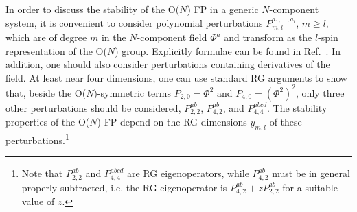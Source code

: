 \documentclass[a4paper,12pt]{article}
\begin{document}
In order to discuss the stability of the O($N$) FP  in a 
generic $N$-component system, 
it is convenient to consider polynomial perturbations  
$P_{m,l }^{a_1,\ldots,a_{l} }$, 
$m\ge l$, which are of degree $m$ in the $N$-component field $\Phi^a$
and transform as the $l$-spin representation of the O($N$) group.
Explicitly formulae can be found in Ref.~\cite{CPV-02-mc}.
In addition, one should also consider perturbations containing
derivatives of the field. 
At least near four dimensions, one can use
standard RG arguments to show that, 
beside the O($N$)-symmetric terms $P_{2,0}=\Phi^2$ and 
$P_{4,0}=(\Phi^2)^2$, only three other perturbations should be 
considered, $P_{2,2}^{ab}$, $P_{4,2}^{ab}$, and 
$P_{4,4}^{abcd}$.
The stability properties 
of the O($N$) FP depend on the RG dimensions $y_{m,l}$ of these 
perturbations.\footnote{Note that $P_{2,2}^{ab}$ and 
$P_{4,4}^{abcd}$ are RG eigenoperators, while $P_{4,2}^{ab}$ 
must be in general properly subtracted, i.e. the 
RG eigenoperator is $P_{4,2}^{ab} + z P_{2,2}^{ab}$ for a suitable value of $z$.}
\end{document}
